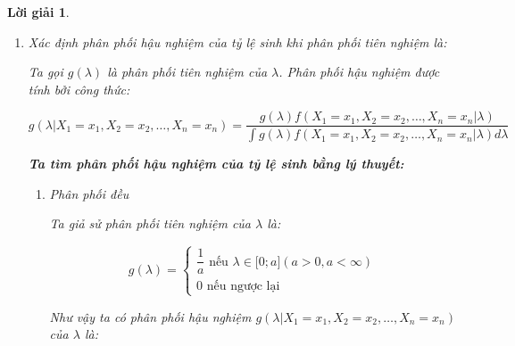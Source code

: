 \documentclass[14pt, a4paper]{article}
\theoremstyle{sltheorem}
\theoremstyle{soltheorem}
\newtheorem*{loigiai}{Lời giải}
\begin{document}
\begin{loigiai}
\begin{enumerate}
        \item Xác định phân phối hậu nghiệm của tỷ lệ sinh khi phân phối tiên nghiệm là:

        Ta gọi $g(\lambda)$ là phân phối tiên nghiệm của $\lambda$.
        Phân phối hậu nghiệm được tính bởi công thức:

        \begin{equation*}
            g(\lambda \vert X_1 =x_1, X_2=x_2, \dots, X_n=x_n) = \dfrac{g(\lambda) f(X_1=x_1,X_2=x_2,\dots, X_n=x_n \vert \lambda)}{\int g(\lambda) f(X_1=x_1,X_2=x_2,\dots, X_n=x_n \vert \lambda) d \lambda}
        \end{equation*}

        \textbf{Ta tìm phân phối hậu nghiệm của tỷ lệ sinh bằng lý thuyết:}

        \begin{enumerate}[label=(\alph*)]
            \item Phân phối đều
            
            Ta giả sử phân phối tiên nghiệm của $\lambda$ là:

            \begin{equation*}
                g(\lambda) = \begin{cases}
                    \dfrac{1}{a} \text{ nếu } \lambda \in \lbrack 0; a\rbrack (a > 0, a < \infty) \\
                    0 \text{ nếu ngược lại}
                \end{cases}
            \end{equation*}

            Như vậy ta có phân phối hậu nghiệm $g(\lambda \vert X_1 =x_1, X_2=x_2, \dots, X_n=x_n)$ của $\lambda$ là:


\end{enumerate}
\end{enumerate}
\end{loigiai}
\end{document}

